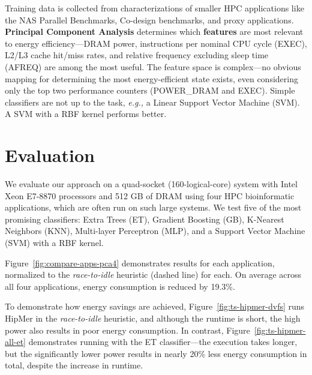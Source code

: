 \documentclass[a0,portrait]{a0poster}
\newcommand{\eg}{\textit{e.g., }}
\newcommand{\figref}[1]{Figure~\ref{fig:#1}}
\newcommand{\PAD}{\vskip 0.75cm}
\begin{document}
\begin{multicols}{2}
Training data is collected from characterizations of smaller HPC applications like the NAS Parallel Benchmarks, Co-design benchmarks, and proxy applications.
\textbf{Principal Component Analysis} determines which \textbf{features} are most relevant to energy efficiency---DRAM power, instructions per nominal CPU cycle (EXEC), L2/L3 cache hit/miss rates, and relative frequency excluding sleep time (AFREQ) are among the most useful.
The feature space is complex---no obvious mapping for determining the most energy-efficient state exists, even considering only the top two performance counters (POWER\_DRAM and EXEC).
Simple classifiers are not up to the task, \eg a Linear Support Vector Machine (SVM).
A SVM with a RBF kernel performs better.


\section*{Evaluation}

We evaluate our approach on a quad-socket (160-logical-core) system with Intel Xeon E7-8870 processors and 512 GB of DRAM using four HPC bioinformatic applications, which are often run on such large systems.
We test five of the most promising classifiers: Extra Trees (ET), Gradient Boosting (GB), K-Nearest Neighbors (KNN), Multi-layer Perceptron (MLP), and a Support Vector Machine (SVM) with a RBF kernel.

{
\PAD
\PAD
\centering
  
  \label{fig:compare-apps-pca4}
\PAD
}

\figref{compare-apps-pca4} demonstrates results for each application, normalized to the \emph{race-to-idle} heuristic (dashed line) for each.
On average across all four applications, energy consumption is reduced by 19.3\%.

{
\PAD
\PAD
\centering
  
  \label{fig:ts-hipmer-dvfs}
\PAD
}

{
\PAD
\centering
  
  \label{fig:ts-hipmer-all-et}
\PAD
}

To demonstrate how energy savings are achieved, \figref{ts-hipmer-dvfs} runs HipMer in the \emph{race-to-idle} heuristic, and although the runtime is short, the high power also results in poor energy consumption.
In contrast, \figref{ts-hipmer-all-et} demonstrates running with the ET classifier---the execution takes longer, but the significantly lower power results in nearly 20\% less energy consumption in total, despite the increase in runtime.



\end{multicols}
\end{document}
